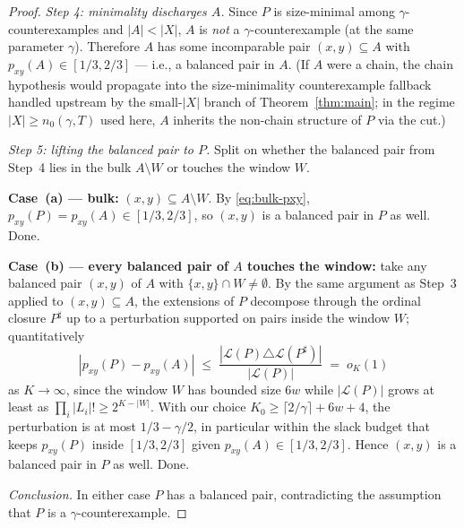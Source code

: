 \begin{proof}
\smallskip\noindent\emph{Step 4: minimality discharges $A$.} Since
$P$ is size-minimal among $\gamma$-counterexamples and $|A| < |X|$,
$A$ is \emph{not} a $\gamma$-counterexample (at the same parameter
$\gamma$). Therefore $A$ has some incomparable pair $(x,y) \subseteq
A$ with $p_{xy}(A) \in [1/3, 2/3]$ — i.e., a balanced pair in $A$.
(If $A$ were a chain, the chain hypothesis would propagate into the
size-minimality counterexample fallback handled upstream by the
small-$|X|$ branch of Theorem~\ref{thm:main}; in the regime
$|X| \ge n_0(\gamma, T)$ used here, $A$ inherits the non-chain
structure of $P$ via the cut.)

\smallskip\noindent\emph{Step 5: lifting the balanced pair to $P$.}
Split on whether the balanced pair from Step~4 lies in the bulk
$A \setminus W$ or touches the window $W$.

\textbf{Case~(a) — bulk:} $(x,y) \subseteq A \setminus W$. By
\eqref{eq:bulk-pxy}, $p_{xy}(P) = p_{xy}(A) \in [1/3, 2/3]$, so
$(x,y)$ is a balanced pair in $P$ as well. Done.

\textbf{Case~(b) — every balanced pair of $A$ touches the window:}
take any balanced pair $(x, y)$ of $A$ with $\{x, y\} \cap W \ne
\emptyset$. By the same argument as Step~3 applied to $(x,y)
\subseteq A$, the extensions of $P$ decompose through the ordinal
closure $P^\sharp$ up to a perturbation supported on pairs inside the
window $W$; quantitatively
\begin{equation}\label{eq:window-pert}
  |p_{xy}(P) - p_{xy}(A)|
  \;\le\;
  \frac{|\mathcal{L}(P) \triangle \mathcal{L}(P^\sharp)|}
       {|\mathcal{L}(P)|}
  \;=\; o_K(1)
\end{equation}
as $K \to \infty$, since the window $W$ has bounded size $6w$ while
$|\mathcal{L}(P)|$ grows at least as $\prod_i |L_i|! \ge 2^{K-|W|}$.
With our choice $K_0 \ge \lceil 2/\gamma \rceil + 6w + 4$, the
perturbation is at most $1/3 - \gamma/2$, in particular within the
slack budget that keeps $p_{xy}(P)$ inside $[1/3, 2/3]$ given
$p_{xy}(A) \in [1/3, 2/3]$. Hence $(x,y)$ is a balanced pair in $P$
as well. Done.

\smallskip\noindent\emph{Conclusion.} In either case $P$ has a
balanced pair, contradicting the assumption that $P$ is a
$\gamma$-counterexample.
\end{proof}

